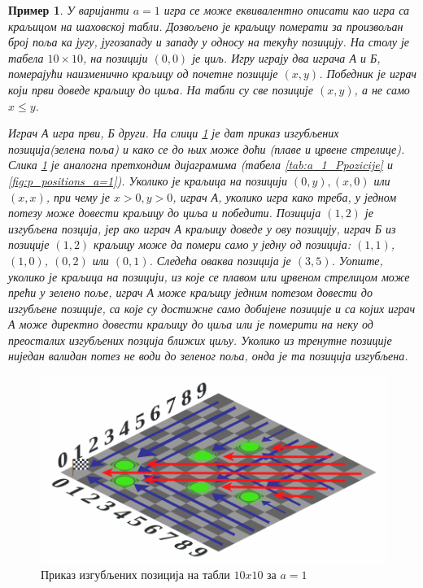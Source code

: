 \documentclass[a4paper]{article}
\newtheorem{example}{Пример}
\begin{document}
\begin{example}
	У варијанти $ a = 1 $ игра се може еквивалентно описати као игра са краљицом на шаховској табли. Дозвољено је краљицу померати за произвољан број поља ка југу, југозападу и западу у односу на текућу позицију. На столу је табела $ 10\times10 $, на позицији $ (0, 0) $ је циљ. Игру играју два играча \textit{А} и \textit{Б}, померајући наизменично краљицу од почетне позиције $ (x,y) $. Победник је играч који први доведе краљицу до циља. На табли су све позиције $ (x, y) $, а не само $ x \leq y $.
	
	Играч \textit{А} игра први, \textit{Б} други. На слици \ref{fig:sahovska_tabla_pozicije_a_1} је дат приказ изгубљених позиција(зелена поља) и како се до њих може доћи (плаве и црвене стрелице). Слика \ref{fig:sahovska_tabla_pozicije_a_1} је аналогна претхондим дијаграмима (табела \ref{tab:a_1_Ppozicije} и \ref{fig:p_positions_a=1}). Уколико је краљица на позицији $ (0, y), (x,0) $ или $ (x,x) $, при чему је $ x > 0, y > 0 $, играч \textit{А}, уколико игра како треба, у једном потезу може довести краљицу до циља и победити. Позиција $ (1, 2) $ је изгубљена позција, јер ако играч \textit{А} краљицу доведе у ову позицију, играч \textit{Б} из позиције $ (1, 2) $ краљицу може да помери само у једну од позиција: $ (1, 1) $, $ (1, 0) $, $ (0, 2) $ или $ (0, 1) $. Следећа оваква позиција је $ (3, 5) $. Уопште, уколико је краљица на позицији, из које се плавом или црвеном стрелицом може прећи у зелено поље, играч \textit{А} може краљицу једним потезом довести до изгубљене позиције, са које су достижне само добијене позиције и са којих играч \textit{А} може директно довести краљицу до циља или је померити на неку од преосталих изгубљених позција ближих циљу. Уколико из тренутне позиције ниједан валидан потез не води до зеленог поља, онда је та позиција изгубљена.
\end{example}
 
\begin{figure}[H]
	\begin{center}
		\includegraphics[width=\textwidth]{10x10_a1.png}
	\end{center}
	\caption{Приказ изгубљених позиција на табли $ 10x10 $ за $ a = 1 $}
	\label{fig:sahovska_tabla_pozicije_a_1}
\end{figure}
\end{document}

